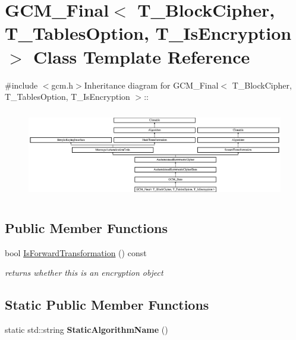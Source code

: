 \hypertarget{class_g_c_m___final}{
\section{GCM\_\-Final$<$ T\_\-BlockCipher, T\_\-TablesOption, T\_\-IsEncryption $>$ Class Template Reference}
\label{class_g_c_m___final}
}


 


{\ttfamily \#include $<$gcm.h$>$}Inheritance diagram for GCM\_\-Final$<$ T\_\-BlockCipher, T\_\-TablesOption, T\_\-IsEncryption $>$::\begin{figure}[H]
\begin{center}
\leavevmode
\includegraphics[height=3.91951cm]{class_g_c_m___final}
\end{center}
\end{figure}
\subsection*{Public Member Functions}
\begin{DoxyCompactItemize}
\item 
\hypertarget{class_g_c_m___final_a0a40dd5c16283699e63f8402c1ec80df}{
bool \hyperlink{class_g_c_m___final_a0a40dd5c16283699e63f8402c1ec80df}{IsForwardTransformation} () const }
\label{class_g_c_m___final_a0a40dd5c16283699e63f8402c1ec80df}

\begin{DoxyCompactList}\small\item\em returns whether this is an encryption object \item\end{DoxyCompactList}\end{DoxyCompactItemize}
\subsection*{Static Public Member Functions}
\begin{DoxyCompactItemize}
\item 
\hypertarget{class_g_c_m___final_a6bfa739b38fd8cbb8d1b814b5b147f9d}{
static std::string {\bfseries StaticAlgorithmName} ()}
\label{class_g_c_m___final_a6bfa739b38fd8cbb8d1b814b5b147f9d}

\end{DoxyCompactItemize}



